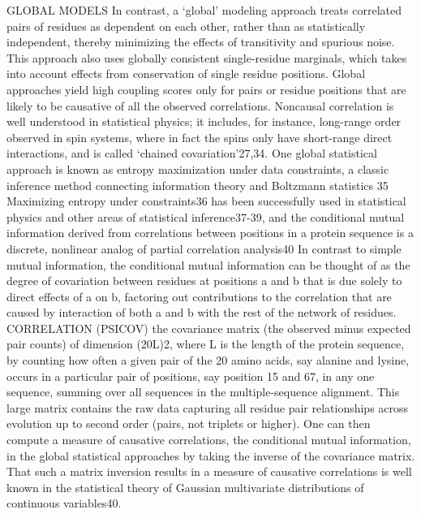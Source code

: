 GLOBAL MODELS \cite{marks2012protein}
	In contrast, a `global' modeling approach treats correlated pairs of residues as dependent on each other, rather than as statistically independent, thereby minimizing the effects of transitivity and spurious noise. \cite{marks2012protein}
	This approach also uses globally consistent single-residue marginals, which takes into account effects from conservation of single residue positions. Global approaches yield high coupling scores only for pairs or residue positions that are likely to be causative of all the observed correlations. \cite{marks2012protein}
	Noncausal correlation is well understood in statistical physics; it includes, for instance, long-range order observed in spin systems, where in fact the spins only have short-range direct interactions, and is called `chained covariation'27,34.  \cite{marks2012protein}
	One global statistical approach is known as entropy maximization under data constraints, a classic inference method connecting information theory and Boltzmann statistics 35 \cite{marks2012protein}
	Maximizing entropy under constraints36 has been successfully used in statistical physics and other areas of statistical inference37-39, and the conditional mutual information derived from correlations between positions in a protein sequence is a discrete, nonlinear analog of partial correlation analysis40 \cite{marks2012protein}
	In contrast to simple mutual information, the conditional mutual information can be thought of as the degree of covariation between residues at positions a and b that is due solely to direct effects of a on b, factoring out contributions to the correlation that are caused by interaction of both a and b with the rest of the network of residues. \cite{marks2012protein}
	CORRELATION (PSICOV) the covariance matrix (the observed minus expected pair counts) of dimension (20L)2, where L is the length of the protein sequence, by counting how often a given pair of the 20 amino acids, say alanine and lysine, occurs in a particular pair of positions, say position 15 and 67, in any one sequence, summing over all sequences in the multiple-sequence alignment. This large matrix contains the raw data capturing all residue pair relationships across evolution up to second order (pairs, not triplets or higher). One can then compute a measure of causative correlations, the conditional mutual information, in the global statistical approaches by taking the inverse of the covariance matrix. That such a matrix inversion results in a measure of causative correlations is well known in the statistical theory of Gaussian multivariate distributions of continuous variables40. \cite{marks2012protein}
